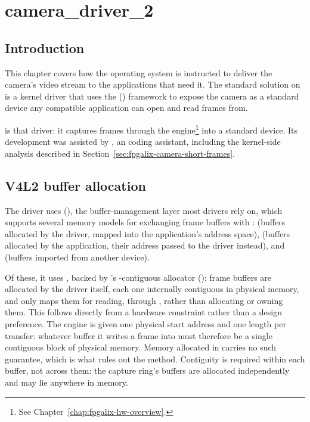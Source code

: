 \chapter{camera\_driver\_2}
\label{chap:fpgalix-camera-driver-2}

\section{Introduction}
\label{sec:fpgalix-camera-intro}

This chapter covers how the operating system is instructed to deliver the  camera's video stream to the applications that need it. The standard solution on  is a kernel driver that uses the  () framework to expose the camera as a standard device any compatible application can open and read frames from.

 is that driver: it captures frames through the   engine\footnote{See Chapter~\ref{chap:fpgalix-hw-overview}.} into a standard  device. Its development was assisted by , an  coding assistant, including the kernel-side analysis described in Section~\ref{sec:fpgalix-camera-short-frames}.

\section{V4L2 buffer allocation}
\label{sec:fpgalix-camera-buffer-allocation}

The driver uses  (), the buffer-management layer most  drivers rely on, which supports several memory models for exchanging frame buffers with :  (buffers allocated by the driver, mapped into the application's address space),  (buffers allocated by the application, their address passed to the driver instead), and  (buffers imported from another device).

Of these, it uses , backed by 's -contiguous allocator (): frame buffers are allocated by the driver itself, each one internally contiguous in physical memory, and  only maps them for reading, through , rather than allocating or owning them. This follows directly from a hardware constraint rather than a design preference. The  engine is given one physical start address and one length per transfer: whatever buffer it writes a frame into must therefore be a single contiguous block of physical memory. Memory allocated in  carries no such guarantee, which is what rules out the  method. Contiguity is required within each buffer, not across them: the capture ring's buffers are allocated independently and may lie anywhere in memory.

